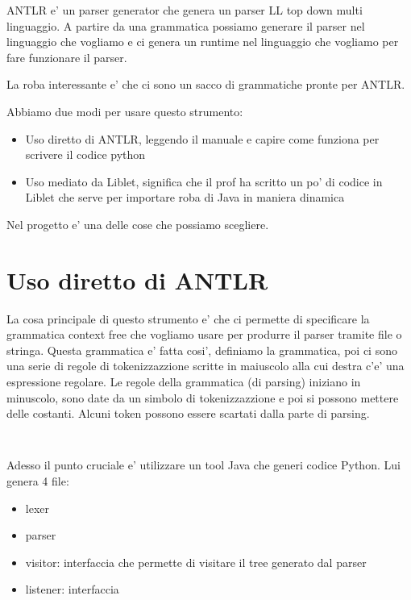 ANTLR e' un parser generator che genera un parser LL top down multi linguaggio. A partire da una grammatica possiamo generare il parser nel linguaggio che vogliamo e ci genera un runtime nel linguaggio che vogliamo per fare funzionare il parser.

La roba interessante e' che ci sono un sacco di grammatiche pronte per ANTLR.

Abbiamo due modi per usare questo strumento:
\begin{itemize}
    \item Uso diretto di ANTLR, leggendo il manuale e capire come funziona per scrivere il codice python
    \item Uso mediato da Liblet, significa che il prof ha scritto un po' di codice in Liblet che serve per importare roba di Java in maniera dinamica
\end{itemize}

Nel progetto e' una delle cose che possiamo scegliere.

\section{Uso diretto di ANTLR}

La cosa principale di questo strumento e' che ci permette di specificare la grammatica context free che vogliamo usare per produrre il parser tramite file o stringa. Questa grammatica e' fatta cosi', definiamo la grammatica, poi ci sono una serie di regole di tokenizzazzione scritte in maiuscolo alla cui destra c'e' una espressione regolare. Le regole della grammatica (di parsing) iniziano in minuscolo, sono date da un simbolo di tokenizzazzione e poi si possono mettere delle costanti.
Alcuni token possono essere scartati dalla parte di parsing.

\begin{lstlisting}
    
\end{lstlisting}

Adesso il punto cruciale e' utilizzare un tool Java che generi codice Python. Lui genera 4 file:
\begin{itemize}
    \item lexer
    \item parser
    \item visitor: interfaccia che permette di visitare il tree generato dal parser
    \item listener: interfaccia
\end{itemize}

